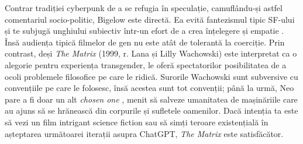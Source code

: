 \documentclass[12pt]{article}
\begin{document}
Contrar tradiției cyberpunk de a se refugia în speculație, camuflându-și astfel comentariul socio-politic, Bigelow este directă. Ea evită fantezismul tipic SF-ului și te subjugă unghiului subiectiv într-un efort de a crea înțelegere și empatie \cite{Ebert1995a}. Însă audiența tipică filmelor de gen nu este atât de tolerantă la coerciție. Prin contrast, deși \textit{The Matrix} (1999, r. Lana și Lilly Wachowski) este interpretat ca o alegorie pentru experiența transgender, le oferă spectatorilor posibilitatea de a ocoli problemele filosofice pe care le ridică.  Surorile Wachowski sunt subversive cu convențiile pe care le folosesc, însă acestea sunt tot convenții; până la urmă, Neo pare a fi doar un alt \textit{chosen one} \cite{LamanTrulyUnderstand2023}, menit să salveze umanitatea de mașinăriile care au ajuns să se hrănească din corpurile și sufletele oamenilor. Dacă intenția ta este să vezi un film intrigant science fiction sau să simți teroare existențială în așteptarea următoarei iterații asupra ChatGPT, \textit{The Matrix} este satisfăcător.\par
\end{document}
